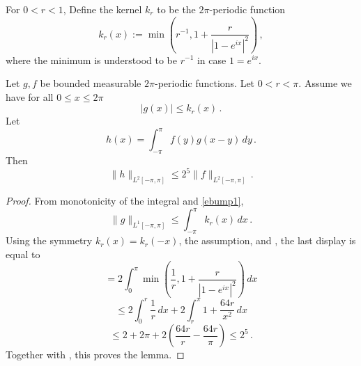 For $0<r<1$, Define the kernel $k_r$ to be the $2\pi$-periodic function
\begin{equation}
    k_r(x):=\min \left(r^{-1}, 1+\frac r{|1-e^{ix}|^2}\right)\, ,
\end{equation}
where the minimum is understood to be $r^{-1}$ in case $1=e^{ix}$.
\begin{lemma}
\label{integrable-bump-convolution}
\leanok
{}
Let $g,f$ be bounded measurable $2\pi$-periodic functions. Let $0<r<\pi$.
Assume we have for all $0\le x\le 2\pi$
\begin{equation}\label{ebump1}
    |g(x)|\le k_r(x)\, .
\end{equation}
Let
\begin{equation}
   h(x)= \int_{-\pi}^{\pi} f(y)g(x-y)\, dy \, .
\end{equation}
Then
\begin{equation}
   \|h\|_{L^2[-\pi, \pi]}\le 2^{5}\|f\|_{L^2[-\pi, \pi]} \, .
\end{equation}

\end{lemma}

\begin{proof}
From monotonicity of the integral and \eqref{ebump1},
\begin{equation}
    \|g\|_{L^1[-\pi, \pi]} \le \int_{-\pi}^{\pi}k_r(x)\, dx\,.
\end{equation}
Using the symmetry
$k_r(x)=k_r(-x)$, the assumption, and , the last display
is equal to
\begin{equation*}
    = 2 \int_0^\pi \min\left(\frac 1r, 1+\frac r{|1-e^{ix}|^2}\right)\, dx
\end{equation*}
\begin{equation*}
    \le 2\int_0^{r} \frac 1r \, dx+2\int_r^{\pi}1+\frac {64r}{x^2}\, dx
\end{equation*}
\begin{equation}
    \le 2+2\pi + 2\left(\frac {64r}r-\frac {64r}{\pi}\right)
    \le 2^{5}\, .
\end{equation}
    Together with , this proves the lemma.
\end{proof}

